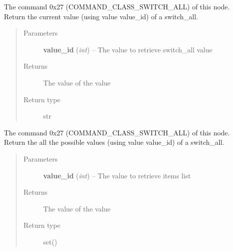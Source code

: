 \documentclass[letterpaper,10pt,english]{sphinxmanual}
\begin{document}
\begin{fulllineitems}
\begin{fulllineitems}
\end{fulllineitems}


\begin{fulllineitems}
\label{command:openzwave.command.ZWaveNodeSwitch.get_switch_all_item}
The command 0x27 (COMMAND\_CLASS\_SWITCH\_ALL) of this node.
Return the current value (using value value\_id) of a switch\_all.
\begin{quote}\begin{description}
\item[{Parameters}] \leavevmode
\textbf{value\_id} (\emph{int}) -- The value to retrieve switch\_all value

\item[{Returns}] \leavevmode
The value of the value

\item[{Return type}] \leavevmode
str

\end{description}\end{quote}

\end{fulllineitems}


\begin{fulllineitems}
\label{command:openzwave.command.ZWaveNodeSwitch.get_switch_all_items}
The command 0x27 (COMMAND\_CLASS\_SWITCH\_ALL) of this node.
Return the all the possible values (using value value\_id) of a switch\_all.
\begin{quote}\begin{description}
\item[{Parameters}] \leavevmode
\textbf{value\_id} (\emph{int}) -- The value to retrieve items list

\item[{Returns}] \leavevmode
The value of the value

\item[{Return type}] \leavevmode
set()

\end{description}\end{quote}

\end{fulllineitems}


\end{fulllineitems}
\end{document}
